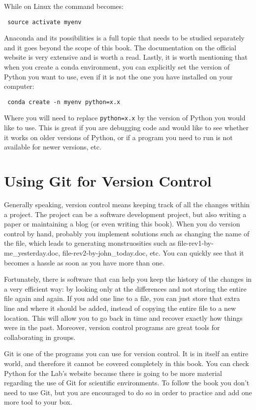 While on Linux the command becomes:
\begin{verbatim}
 source activate myenv
\end{verbatim}

Anaconda and its possibilities is a full topic that needs to be studied separately and it goes beyond the scope of this book. The documentation on the official website is very extensive and is worth a read. Lastly, it is worth mentioning that when you create a conda environment, you can explicitly set the version of Python you want to use, even if it is not the one you have installed on your computer:

\begin{verbatim}
 conda create -n myenv python=x.x
\end{verbatim}

Where you will need to replace \texttt{python=x.x} by the version of Python you would like to use. This is great if you are debugging code and would like to see whether it works on older versions of Python, or if a program you need to run is not available for newer versions, etc.

\section{Using Git for Version Control}
Generally speaking, version control means keeping track of all the changes within a project. The project can be a software development project, but also writing a paper or maintaining a blog (or even writing this book). When you do version control by hand, probably you implement solutions such as changing the name of the file, which leads to generating monstruosities such as file-rev1-by-me\_yesterday.doc, file-rev2-by-john\_today.doc, etc. You can quickly see that it becomes a hassle as soon as you have more than one.

Fortunately, there is software that can help you keep the history of the changes in a very efficient way: by looking only at the differences and not storing the entire file again and again. If you add one line to a file, you can just store that extra line and where it should be added, instead of copying the entire file to a new location. This will allow you to go back in time and recover exactly how things were in the past. Moreover, version control programs are great tools for collaborating in groups.

Git is one of the programs you can use for version control. It is in itself an entire world, and therefore it cannot be covered completely in this book. You can check Python for the Lab’s website because there is going to be more material regarding the use of Git for scientific environments. To follow the book you don’t need to use Git, but you are encouraged to do so in order to practice and add one more tool to your box.

